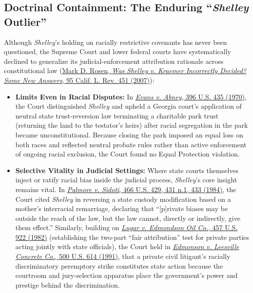 \documentclass[12pt]{article}
\begin{document}
\subsection{Doctrinal Containment: The Enduring ``\textit{Shelley} Outlier''}
Although \textit{Shelley}'s holding on racially restrictive covenants has never been questioned, the Supreme Court and lower federal courts have systematically declined to generalize its judicial-enforcement attribution rationale across constitutional law (\href{https://lawcat.berkeley.edu/record/1121131/files/fulltext.pdf}{Mark D. Rosen, \textit{Was Shelley v. Kraemer Incorrectly Decided? Some New Answers}, 95 Calif. L. Rev. 451 (2007)}):
\begin{itemize}
    \item \textbf{Limits Even in Racial Disputes:} In \href{https://supreme.justia.com/cases/federal/us/396/435/}{\textit{Evans v. Abney}, 396 U.S. 435 (1970)}, the Court distinguished \textit{Shelley} and upheld a Georgia court's application of neutral state trust-reversion law terminating a charitable park trust (returning the land to the testator's heirs) after racial segregation in the park became unconstitutional. Because closing the park imposed an equal loss on both races and reflected neutral probate rules rather than active enforcement of ongoing racial exclusion, the Court found no Equal Protection violation.
    \item \textbf{Selective Vitality in Judicial Settings:} Where state courts themselves inject or ratify racial bias inside the judicial process, \textit{Shelley}'s core insight remains vital. In \href{https://supreme.justia.com/cases/federal/us/466/429/}{\textit{Palmore v. Sidoti}, 466 U.S. 429, 431 n.1, 433 (1984)}, the Court cited \textit{Shelley} in reversing a state custody modification based on a mother's interracial remarriage, declaring that ``[p]rivate biases may be outside the reach of the law, but the law cannot, directly or indirectly, give them effect.'' Similarly, building on \href{https://supreme.justia.com/cases/federal/us/457/922/}{\textit{Lugar v. Edmondson Oil Co.}, 457 U.S. 922 (1982)} (establishing the two-part ``fair attribution'' test for private parties acting jointly with state officials), the Court held in \href{https://supreme.justia.com/cases/federal/us/500/614/}{\textit{Edmonson v. Leesville Concrete Co.}, 500 U.S. 614 (1991)}, that a private civil litigant's racially discriminatory peremptory strike constitutes state action because the courtroom and jury-selection apparatus place the government's power and prestige behind the discrimination.

\end{itemize}
\end{document}
